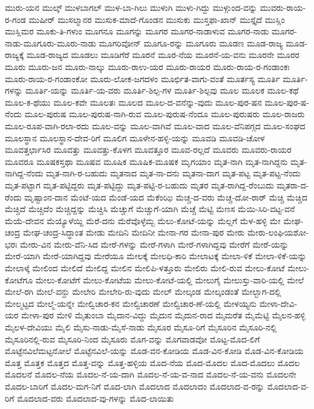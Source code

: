 {ಮುರು-ಯನ
ಮುಲ್ಕ್
ಮುಳಬಾಗಲ್
ಮುಳ-ಬಾ-ಗಿಲು
ಮುಳುಗಿ
ಮುಳು-ಗಿದ್ದು
ಮುಳ್ಗುಂದ-ವನ್ನು
ಮುವರು-ರಾಯ-ರ-ಗಂಡ
ಮುಷೀರ್
ಮುಸಲ್ಮಾನರ
ಮುಸುಕ-ಮಾದೆ-ಗೊಂಡನ
ಮುಸುಕು
ಮುಸ್ತಫಾ-ಖಾನ್
ಮುಸ್ತೈದೆ
ಮುಸ್ಲಿಂ
ಮುಸ್ಲಿಮರ
ಮೂಕು-ತಿ-ಗಳುಂ
ಮೂಗನೂ
ಮೂಗನ್ನು
ಮೂಗರ
ಮೂಗರ-ನಾಡಾಳುವ
ಮೂಗರ-ನಾಡು
ಮೂಗರ-ನಾಡು-ಮೂಗೂರು-ಮೂರು-ನಾಡು
ಮೂಗರಿವೋನ್
ಮೂಗೂ-ರನ್ನು
ಮೂಗೂರು
ಮೂಡಣ
ಮೂಡ-ರಾಜ್ಯ
ಮೂಡ-ರಾಜ್ಯಕ್ಕೆ
ಮೂಡ-ರಾಜ್ಯದ
ಮೂಡಲು
ಮೂಡಿಗೆರೆ
ಮೂರನೆ
ಮೂರ-ನೆಯ
ಮೂರನೆ-ಯ-ವನು
ಮೂರನೇ
ಮೂರರ
ಮೂರು
ಮೂರು-ಜನ
ಮೂರು-ನಾಲ್ಕು
ಮೂರು-ರಾಉ-ಯರ
ಮೂರು-ರಾಯರ
ಮೂರು-ರಾಯ-ರ-ಗಂಡಾಂಕಃ
ಮೂರು-ರಾಯ-ರ-ಗಂಡಾಂಕೋ
ಮೂರು-ಲೋಕ-ಜಗದಳಂ
ಮೂರ್ಛಿತ-ವಾಗು-ವಂತೆ
ಮೂರ್ತಸ್ಯ
ಮೂರ್ತಿ
ಮೂರ್ತಿ-ಗಳನ್ನು
ಮೂರ್ತಿ-ಯನ್ನು
ಮೂರ್ತಿ-ಯ-ವರು
ಮೂರ್ತಿ-ಶಿಲ್ಪ-ಗಳ
ಮೂರ್ತಿ-ಶಿಲ್ಪವು
ಮೂಲ
ಮೂಲಕ
ಮೂಲ-ಕಥೆ
ಮೂಲ-ಕ-ಥೆಯು
ಮೂಲ-ಕವೇ
ಮೂಲತಃ
ಮೂಲದ
ಮೂಲ-ದ-ವನೆನ್ನು-ವುದು
ಮೂಲ-ಪುರ-ಷನ
ಮೂಲ-ಪುರ-ಷ-ನೆಂದು
ಮೂಲ-ಪುರುಷ
ಮೂಲ-ಪುರುಷ-ನಾಗಿ-ರುವ
ಮೂಲ-ಪುರುಷ-ನೆಂದೂ
ಮೂಲ-ಪುರುಷರು
ಮೂಲ-ರಾಜರು
ಮೂಲ-ರೂಪ-ವಾಗಿ-ರಲಾ-ರದು
ಮೂಲ-ವನ್ನು
ಮೂಲ-ವಾಗಿವೆ
ಮೂಲ-ವಾದ
ಮೂಲ-ವೆನಿಪಗ್ಗದ
ಮೂಲ-ಸಂಘದ
ಮೂಲಸ್ಥಾನ
ಮೂಲಸ್ಥಾನ-ದೇವ-ರಿಗೆ
ಮೂಲಿಗ
ಮೂಳೇನ-ಹಳ್ಳಿ-ಯನ್ನು
ಮೂವಡಿ
ಮೂವಡಿ-ಚೋಳ
ಮೂವತ್ತರ್ಛಾಸಿರ
ಮೂವತ್ತು
ಮೂವತ್ತು-ಕೊಳಗ
ಮೂವತ್ತೂರ
ಮೂವ-ರಲ್ಲದೆ
ಮೂವರು
ಮೂವರು-ರಾಯರ
ಮೂವರೂ
ಮೂಷಕಸ್ತಥಾ
ಮೂಷವ
ಮೂಷಿಕ
ಮೂಷಿಕ-ಮೂಷಕ
ಮೃಗಯಾಂ
ಮೃತ-ನಾಗಿ
ಮೃತ-ನಾಗಿದ್ದನು
ಮೃತ-ನಾಗಿದ್ದ-ನೆಂದು
ಮೃತ-ನಾಗಿ-ರ-ಬಹುದು
ಮೃತನಾದ
ಮೃತ-ನಾ-ದನು
ಮೃತನಾ-ದಾಗ
ಮೃತ-ಪಟ್ಟ
ಮೃತ-ಪಟ್ಟ-ನೆಂದು
ಮೃತ-ಪಟ್ಟಾಗ
ಮೃತ-ಪಟ್ಟಿದ್ದರು
ಮೃತ-ಪಟ್ಟಿದ್ದು
ಮೃತ-ಪಟ್ಟಿ-ರ-ಬಹುದು
ಮೃತರ
ಮೃತ-ರಾಗಿದ್ದ-ರೆಂಬುದು
ಮೃತರಾ-ದ-ರೆಂದು
ಮೃಷ್ಟಾಂನ-ದಾನ
ಮೆಂಟೆ-ಯದ
ಮೆಂಡೆ-ಯದ
ಮೆಕೆಂಝಿ
ಮೆಚ್ಚ-ದ-ವರು
ಮೆಚ್ಚ-ದೋ-ರಾರ್
ಮೆಚ್ಚಿ
ಮೆಚ್ಚಿದ
ಮೆಚ್ಚಿದೆ
ಮೆಚ್ಚಿದೆಂ
ಮೆಚ್ಚಿದ್ದನ್ನು
ಮೆಚ್ಚಿಸಿ
ಮೆಚ್ಚುಗೆ
ಮೆಚ್ಚುಗೆ-ಯಾಗಿ
ಮೆಚ್ಚೆ
ಮೆಟ್ಟಿ
ಮೆಣಸ
ಮೆಯಿ-ಸಿರಿ-ವಟ್ಟ-ವನೆ
ಮೆಯೆ-ದೇವನ
ಮೆಯ್ಯೊಳೆಯ್ದಿ
ಮೆರೆ-ದನು
ಮೆರೆವೊಳ್ಳೆಮ್ಬ
ಮೆಲು-ಕೋಟೆ-ಯನ್ನು
ಮೆಲ್ಲಗೆ
ಮೆಳ-ಹಳ್ಳಿ
ಮೇ
ಮೇಘ-ಚಂದ್ರ
ಮೇಘ-ಚಂದ್ರ-ಸಿದ್ಧಾಂತ
ಮೇಡು
ಮೇದಿನಿ
ಮೇದಿನೀ
ಮೇನಾ-ಗರ
ಮೇನಾ-ಪುರ
ಮೇರು
ಮೇರು-ಲಂಘಿಯಶೋ-ಭರಃ
ಮೇರು-ವಿನ
ಮೇರು-ವೆನಿ-ಸಿದ
ಮೇರೆ-ಗಳನ್ನು
ಮೇರೆ-ಗಳಾಗಿ
ಮೇರೆ-ಗಳಾಗಿದ್ದವು
ಮೇರೆಗೆ
ಮೇರೆ-ಯನ್ನು
ಮೇರೆ-ಯಾಗಿ
ಮೇರೆ-ಯಾಗಿದ್ದವು
ಮೇರೆಯೂ
ಮೇಲಕ್ಕೆ
ಮೇಲಧಿ-ಕಾರಿ
ಮೇಲಾಟಕ್ಕೆ
ಮೇಲಾ-ಳಿಕೆ
ಮೇಲಾ-ಳಿಕೆ-ಯನ್ನು
ಮೇಲಾಳ್ಕೆ
ಮೇಲಿಂದ
ಮೇಲಿದೆ
ಮೇಲಿದ್ದ
ಮೇಲಿನ
ಮೇಲಿಪಿ-ಳತ್ತೂರು
ಮೇಲಿರು
ಮೇಲಿ-ರುವ
ಮೇಲು-ಕೋಟೆ
ಮೇಲು-ಕೋಟೆಗೂ
ಮೇಲು-ಕೋಟೆಗೆ
ಮೇಲು-ಕೋಟೆಯ
ಮೇಲು-ಕೋಟೆ-ಯಲ್ಲಿ
ಮೇಲುಗೈ
ಮೇಲುಸ್ತು-ವಾರಿ-ಯಲ್ಲಿ
ಮೇಲೆ
ಮೇಲೆ-ರಗಿ
ಮೇಲೆ-ವನ್ದು
ಮೇಲೇರಿ
ಮೇಲೇರಿ-ರು-ವುದು
ಮೇಲ್
ಮೇಲ್ಕಂಡ
ಮೇಲ್ಕಂಡಂತೆ
ಮೇಲ್ಬಾಗ-ದಲ್ಲಿ
ಮೇಲ್ಮಟ್ಟದ
ಮೇಲ್ಮೆ-ಯನ್ನೇ
ಮೇಲ್ವಿಚಾರ-ಕನ
ಮೇಲ್ವಿಚಾರಣೆ
ಮೇಲ್ವಿಚಾರ-ಣೆ-ಯಲ್ಲಿ
ಮೇಳಯ್ಯನು
ಮೇಳಾ-ದೇವಿ-ಯರ
ಮೇಳಾ-ಪುರ
ಮೇಳಿ
ಮೈತುಂಬಾ
ಮೈದಾನ-ವಿದ್ದು
ಮೈದುನ
ಮೈದುನ-ರಾದ
ಮೈಮರೆತ
ಮೈಮೆಟ್ಟಿ
ಮೈಲನ-ಹಳ್ಳಿ
ಮೈಲಳ-ದೇವಿಯು
ಮೈಲಿ
ಮೈಸು-ನಾಡು-ಮೈಸೆ-ನಾಡು
ಮೈಸೂರ
ಮೈಸೂ-ರಿಗೆ
ಮೈಸೂರಿನ
ಮೈಸೂರಿ-ನಲ್ಲಿ
ಮೈಸೂರಿನಲ್ಲಿ-ರುವ
ಮೈಸೂರಿ-ನಿಂದ
ಮೈಸೂರು
ಮೊಗ-ವನ್ನು
ಮೊಗವಾಡವೋ
ಮೊಟ್ಟ-ಮೊದ-ಲಿಗೆ
ಮೊಟ್ಟೆನವಿಲೆಮಟ್ಟನೋಲೆ
ಮೊಟ್ಟೆನವಿಲೆ-ಯನ್ನು
ಮೊಡ-ವನ-ಕೋಡಿಯ
ಮೊಡ-ವಿನ-ಕೋಡಿ
ಮೊಡ-ವಿನ-ಕೋಡಿಯ
ಮೊತ್ತ
ಮೊತ್ತಕ
ಮೊತ್ತದ
ಮೊತ್ತ-ವನ್ನು
ಮೊತ್ತ-ಹಳ್ಳಿಯ
ಮೊದ-ನೆಯ
ಮೊದ-ಮೊದಲ
ಮೊದ-ಮೊದಲು
ಮೊದಲ
ಮೊದಲನೆ
ಮೊದಲ-ನೆಯ
ಮೊದಲ-ನೆ-ಯ-ದಾಗಿ
ಮೊದಲ-ನೆ-ಯ-ವ-ನಾದ
ಮೊದಲ-ನೆ-ಯ-ವನು
ಮೊದಲನೇ
ಮೊದಲ-ಬಾರಿಗೆ
ಮೊದಲ-ಮಗ-ನಿಗೆ
ಮೊದ-ಲಾಗಿ
ಮೊದಲಾದ
ಮೊದಲಾದಂ
ಮೊದಲಾದ-ವ-ರನ್ನು
ಮೊದಲಾದ-ವ-ರಿಗೆ
ಮೊದಲಾದ-ವರು
ಮೊದಲಾದ-ವು-ಗಳನ್ನು
ಮೊದ-ಲಾಯಿತು
}
